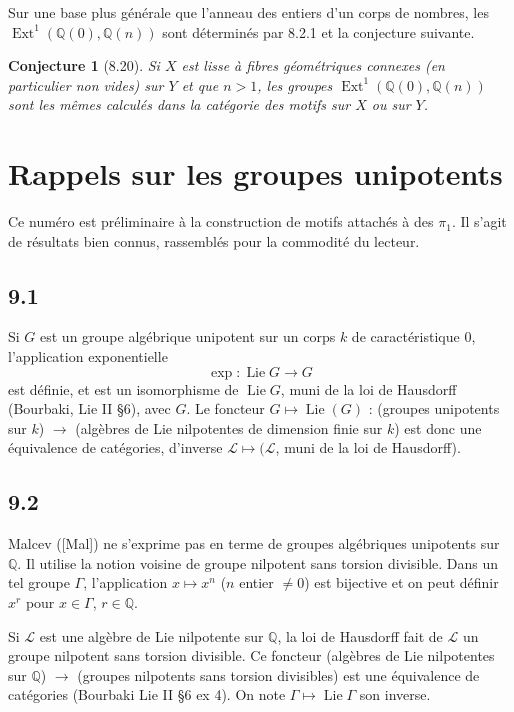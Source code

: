 \documentclass[12pt,a4paper]{article}
\theoremstyle{plain}
\newtheorem{conjecture}[theorem]{Conjecture}
\theoremstyle{definition}
\theoremstyle{remark}
\DeclareMathOperator{\Lie}{Lie}
\DeclareMathOperator{\Ext}{Ext}
\newcommand{\Q}{\mathbb{Q}}
\begin{document}
Sur une base plus g\'en\'erale que l'anneau des entiers d'un corps de nombres, les $\Ext^1(\Q(0), \Q(n))$ sont d\'etermin\'es par 8.2.1 et la conjecture suivante.

\begin{conjecture}[8.20]
Si $X$ est lisse \`a fibres g\'eom\'etriques connexes (en particulier non vides) sur $Y$ et que $n > 1$, les groupes $\Ext^1(\Q(0), \Q(n))$ sont les m\^emes calcul\'es dans la cat\'egorie des motifs sur $X$ ou sur $Y$.
\end{conjecture}

\section{Rappels sur les groupes unipotents}

Ce num\'ero est pr\'eliminaire \`a la construction de motifs attach\'es \`a des $\pi_1$. Il s'agit de r\'esultats bien connus, rassembl\'es pour la commodit\'e du lecteur.

\subsection*{9.1}

Si $G$ est un groupe alg\'ebrique unipotent sur un corps $k$ de caract\'eristique 0, l'application exponentielle
$$\exp : \Lie G \longrightarrow G$$
est d\'efinie, et est un isomorphisme de $\Lie G$, muni de la loi de Hausdorff (Bourbaki, Lie II \S 6), avec $G$. Le foncteur $G \mapsto \Lie(G)$ : (groupes unipotents sur $k$) $\to$ (alg\`ebres de Lie nilpotentes de dimension finie sur $k$) est donc une \'equivalence de cat\'egories, d'inverse $\mathcal{L} \mapsto (\mathcal{L}$, muni de la loi de Hausdorff).

\subsection*{9.2}

Malcev ([Mal]) ne s'exprime pas en terme de groupes alg\'ebriques unipotents sur $\Q$. Il utilise la notion voisine de groupe nilpotent sans torsion divisible. Dans un tel groupe $\Gamma$, l'application $x \mapsto x^n$ ($n$ entier $\neq 0$) est bijective et on peut d\'efinir $x^r$ pour $x \in \Gamma$, $r \in \Q$.

Si $\mathcal{L}$ est une alg\`ebre de Lie nilpotente sur $\Q$, la loi de Hausdorff fait de $\mathcal{L}$ un groupe nilpotent sans torsion divisible. Ce foncteur (alg\`ebres de Lie nilpotentes sur $\Q$) $\to$ (groupes nilpotents sans torsion divisibles) est une \'equivalence de cat\'egories (Bourbaki Lie II \S 6 ex 4). On note $\Gamma \mapsto \Lie \Gamma$ son inverse.
\end{document}
